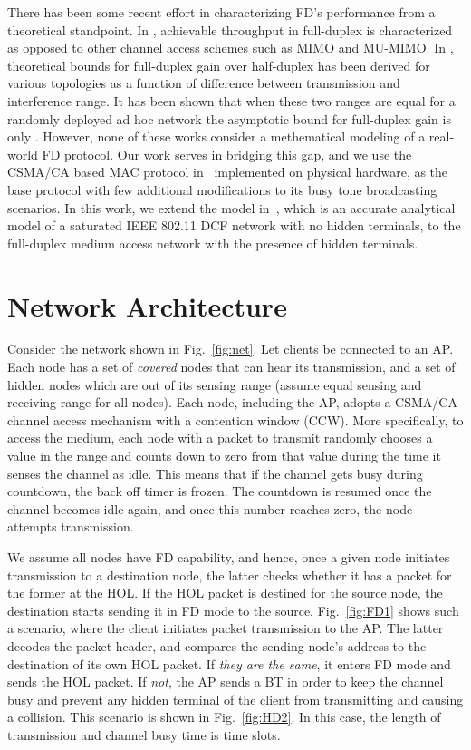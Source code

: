 \documentclass[10pt,journal,cspaper,compsoc]{IEEEtran}
\begin{document}
There has been some recent effort in characterizing FD's performance from a theoretical standpoint.
In \cite{Yang14}, achievable throughput in full-duplex is characterized as opposed to other channel access schemes such as MIMO and MU-MIMO. In \cite{Xie14}, theoretical bounds for full-duplex gain over half-duplex has been derived for various topologies as a function of difference between transmission and interference range. It has been shown that when these two ranges are equal for a randomly deployed ad hoc network the asymptotic bound for full-duplex gain is only . 
However, none of these works consider a methematical modeling of a real-world FD protocol. Our work serves in bridging this gap, and we use the CSMA/CA based MAC protocol in~\cite{Jain11} implemented on physical hardware, as the base protocol with few additional modifications to its busy tone broadcasting scenarios. 
In this work, we extend the model in~\cite{Dai13}, which is an accurate analytical model of a saturated IEEE 802.11 DCF network with no hidden terminals, to the full-duplex medium access network with the presence of hidden terminals. 
\section{Network Architecture}
\label{sec:arch}
Consider the network shown in Fig.~\ref{fig:net}. Let  clients be connected to an AP. Each node  has a set of {\em covered} nodes  that can hear its transmission, and a set of hidden nodes  which are out of its sensing range (assume equal sensing and receiving range for all nodes). Each node, including the AP, adopts a CSMA/CA channel access mechanism with a contention window (CCW). More specifically, to access the medium, each node with a packet to transmit randomly chooses a value in the range  and counts down to zero from that value during the time it senses the channel as idle. This means that if the channel gets busy during countdown, the back off timer is frozen. The countdown is resumed once the channel becomes idle again, and once this number reaches zero, the node attempts transmission. 

We assume all nodes have FD capability, and hence, once a given node initiates transmission to a destination node, the latter checks whether it has a packet for the former at the HOL. If the HOL packet is destined for the source node, the destination starts sending it in FD mode to the source. Fig.~\ref{fig:FD1} shows such a scenario, where the client initiates packet transmission to the AP. The latter decodes the packet header, and compares the sending node's address to the destination of its own HOL packet. If {\em they are the same}, it enters FD mode and sends the HOL packet. If {\em not}, the AP sends a BT in order to keep the channel busy and prevent any hidden terminal of the client from transmitting and causing a collision. This scenario is shown in Fig.~\ref{fig:HD2}. In this case, the length of transmission and channel busy time is  time slots. 
\end{document}
